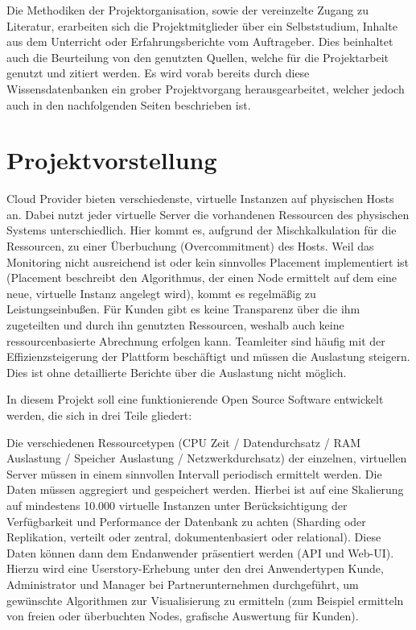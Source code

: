 Die Methodiken der Projektorganisation, sowie der vereinzelte Zugang zu
Literatur, erarbeiten sich die Projektmitglieder über ein Selbststudium, Inhalte
aus dem Unterricht oder Erfahrungsberichte vom Auftrageber. Dies
beinhaltet auch die Beurteilung von den genutzten Quellen, welche für die
Projektarbeit genutzt und zitiert werden. Es wird vorab bereits durch diese
Wissensdatenbanken ein grober Projektvorgang herausgearbeitet, welcher jedoch
auch in den nachfolgenden Seiten beschrieben ist.
\all%

\chapter{Projektvorstellung}
\label{subsec:projektvorstellung}
Cloud Provider bieten verschiedenste, virtuelle Instanzen auf physischen Hosts
an. Dabei nutzt jeder virtuelle Server die vorhandenen Ressourcen des
physischen Systems unterschiedlich. Hier kommt es, aufgrund der
Mischkalkulation für die Ressourcen, zu einer Überbuchung (Overcommitment) des
Hosts. Weil das Monitoring nicht ausreichend ist oder kein sinnvolles Placement
implementiert ist (Placement beschreibt den Algorithmus, der einen Node
ermittelt auf dem eine neue, virtuelle Instanz angelegt wird), kommt es
regelmäßig zu Leistungseinbußen. Für Kunden gibt es keine Transparenz über die
ihm zugeteilten und durch ihn genutzten Ressourcen, weshalb auch keine
ressourcenbasierte Abrechnung erfolgen kann. Teamleiter sind häufig mit der
Effizienzsteigerung der Plattform beschäftigt und müssen die Auslastung
steigern. Dies ist ohne detaillierte Berichte über die Auslastung nicht
möglich.

In diesem Projekt soll eine funktionierende Open Source Software entwickelt
werden, die sich in drei Teile gliedert:

\begin{outline}
  \1 Die verschiedenen Ressourcetypen (CPU Zeit / Datendurchsatz / RAM
  Auslastung / Speicher Auslastung / Netzwerkdurchsatz) der einzelnen,
  virtuellen Server müssen in einem sinnvollen Intervall periodisch ermittelt
  werden.
  \1 Die Daten müssen aggregiert und gespeichert werden. Hierbei ist auf eine
  Skalierung auf mindestens 10.000 virtuelle Instanzen unter Berücksichtigung
  der Verfügbarkeit und Performance der Datenbank zu achten (Sharding oder
  Replikation, verteilt oder zentral, dokumentenbasiert oder relational).
  \1 Diese Daten können dann dem Endanwender präsentiert werden (\gls{API} und
  Web-UI). Hierzu wird eine Userstory-Erhebung unter den drei Anwendertypen
  Kunde, Administrator und Manager bei Partnerunternehmen durchgeführt, um
  gewünschte Algorithmen zur Visualisierung zu ermitteln (zum Beispiel
  ermitteln von freien oder überbuchten Nodes, grafische Auswertung für Kunden).
\end{outline}

